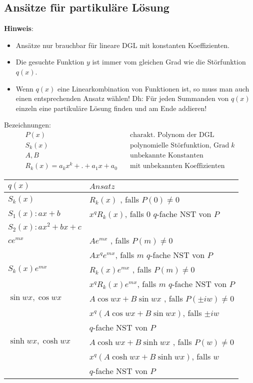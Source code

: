 \subsection{Ansätze für partikuläre Lösung}
\label{sec:ansatz-dgl}
	\textbf{Hinweis}:
	\begin{itemize}
		\item Ansätze nur brauchbar für lineare DGL mit konstanten Koeffizienten.

		\item Die gesuchte Funktion $y$ ist immer vom gleichen Grad wie die Störfunktion $q(x)$.

		\item Wenn $q(x)$ eine Linearkombination von Funktionen ist, so muss man auch einen entsprechenden Ansatz wählen! Dh: Für jeden Summanden von $q(x)$ einzeln eine partikuläre Lösung finden und am Ende addieren!
	\end{itemize}
	Bezeichnungen:
	\begin{align*}
	P(x)  &  \quad \text{charakt. Polynom der DGL}  \\
	S_k(x) & \quad \text{polynomielle Störfunktion, Grad} \; k \\
	A, B & \quad \text{unbekannte Konstanten} \\
	R_k(x) = a_k x^k + . + a_1 x + a_0 & \quad \text{mit unbekannten Koeffizienten}
	\end{align*}
	
	
	
	\begin{tabular}{l|l}
		$q(x)$ & $Ansatz$ \\ \hline \hline
		
		$ S_k(x) $ & $R_k(x)$ , falls $P(0) \neq 0$\\
		\small{$S_1(x): ax + b$} &  $x^q R_k(x)$, falls $0$ $q$-fache NST von $P$ \\ 
		\small{$S_2(x): ax^2 + bx + c$} & \\ \hline

		$ c e^{mx} $  & $A e^{mx}$ , falls $P(m) \neq 0$\\ 
		&  $A x^q e^{mx}$, falls $m$ $q$-fache NST von $P$ \\ \hline

		$ S_k(x) e^{mx} $  & $R_k(x) e^{mx}$ , falls $P(m) \neq 0$\\
		&  $x^q R_k(x) e^{mx}$, falls $m$ $q$-fache NST von $P$ \\ \hline
		$ \sin wx, \cos wx $  & $A \cos wx + B \sin wx$ , falls $P(\pm iw) \neq 0$\\
		&  $x^q (A \cos wx + B \sin wx)$, falls $\pm iw$ \\
		& $q$-fache NST von $P$ \\ \hline
		$ \sinh wx, \cosh wx $  & $A \cosh wx + B \sinh wx$ , falls $P(w) \neq 0$\\
		&  $x^q (A \cosh wx + B \sinh wx)$, falls $w$ \\
		& $q$-fache NST von $P$ \\
	\end{tabular}
